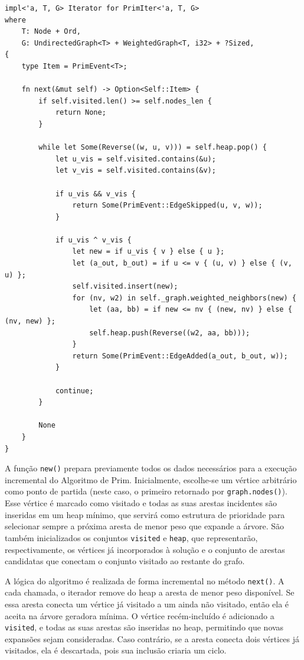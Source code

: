 \begin{listing}[H]
  \caption{Iteração de Prim}
\begin{verbatim}
impl<'a, T, G> Iterator for PrimIter<'a, T, G>
where
    T: Node + Ord,
    G: UndirectedGraph<T> + WeightedGraph<T, i32> + ?Sized,
{
    type Item = PrimEvent<T>;

    fn next(&mut self) -> Option<Self::Item> {
        if self.visited.len() >= self.nodes_len {
            return None;
        }

        while let Some(Reverse((w, u, v))) = self.heap.pop() {
            let u_vis = self.visited.contains(&u);
            let v_vis = self.visited.contains(&v);

            if u_vis && v_vis {
                return Some(PrimEvent::EdgeSkipped(u, v, w));
            }

            if u_vis ^ v_vis {
                let new = if u_vis { v } else { u };
                let (a_out, b_out) = if u <= v { (u, v) } else { (v, u) };
                self.visited.insert(new);
                for (nv, w2) in self._graph.weighted_neighbors(new) {
                    let (aa, bb) = if new <= nv { (new, nv) } else { (nv, new) };
                    self.heap.push(Reverse((w2, aa, bb)));
                }
                return Some(PrimEvent::EdgeAdded(a_out, b_out, w));
            }

            continue;
        }

        None
    }
}
\end{verbatim}
\end{listing}

A função \texttt{new()} prepara previamente todos os dados
necessários para a execução incremental do Algoritmo de Prim.
Inicialmente, escolhe-se um vértice arbitrário como ponto de partida
(neste caso, o primeiro retornado por \texttt{graph.nodes()}). Esse
vértice é marcado como visitado e todas as suas arestas incidentes
são inseridas em um heap mínimo, que servirá como estrutura de
prioridade para selecionar sempre a próxima aresta de menor peso que
expande a árvore. São também inicializados os conjuntos
\texttt{visited} e \texttt{heap}, que representarão, respectivamente,
os vértices já incorporados à solução e o conjunto de arestas
candidatas que conectam o conjunto visitado ao restante do grafo.

A lógica do algoritmo é realizada de forma incremental no método
\texttt{next()}. A cada chamada, o iterador remove do heap a aresta
de menor peso disponível. Se essa aresta conecta um vértice já
visitado a um ainda não visitado, então ela é aceita na árvore
geradora mínima. O vértice recém‑incluído é adicionado a
\texttt{visited}, e todas as suas arestas são inseridas no heap,
permitindo que novas expansões sejam consideradas. Caso contrário, se
a aresta conecta dois vértices já visitados, ela é descartada, pois
sua inclusão criaria um ciclo.

